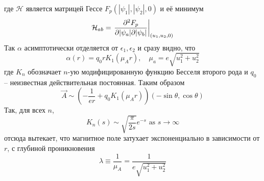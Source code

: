 где \( \mathcal{H} \) является матрицей Гессе \( F_p(|\psi_1|, |\psi_2|, 0) \) 
и её минимум
\begin{equation}
    \mathcal{H}_{ab} = \left. \frac{\partial^2 F_p}{\partial |\psi_a| \partial |\psi_b|} 
        \right|_{(u_1, u_2, 0)}
    \label{eq:12}
\end{equation}
Так \( \alpha \) асимптотически отделяется от \( \epsilon_1, \epsilon_2\) и 
сразу видно, что
\begin{equation}
    \alpha(r) = q_0 r K_1(\mu_A r), \quad
    \mu_a = e\sqrt{u_1^2 + u_2^2}
    \label{eq:13}
\end{equation}
где \( K_n \) обозначает \( n \)-ую модифицированную функцию Бесселя второго 
рода и \( q_0 \) -- неизвестная действительная постоянная. Таким образом
\begin{equation}
    \vec{A} \sim \left( -\frac{1}{er} + q_0 K_1(\mu_A r) \right)
        (-\sin\theta, \cos\theta)
    \label{eq:14}
\end{equation}
Так, для всех \( n \), 
\begin{equation}
    K_n(s) \sim \sqrt{\frac{\pi}{2s}}e^{-s} \text{ as } s \rightarrow \infty
    \label{eq:15}
\end{equation}
отсюда вытекает, что магнитное поле затухает экспоненциально в зависимости от 
\( r \), с глубиной проникновения
\begin{equation}
    \lambda \equiv \frac{1}{\mu_A} = \frac{1}{e\sqrt{u_1^2 + u_2^2}}
    \label{eq:16}
\end{equation}


